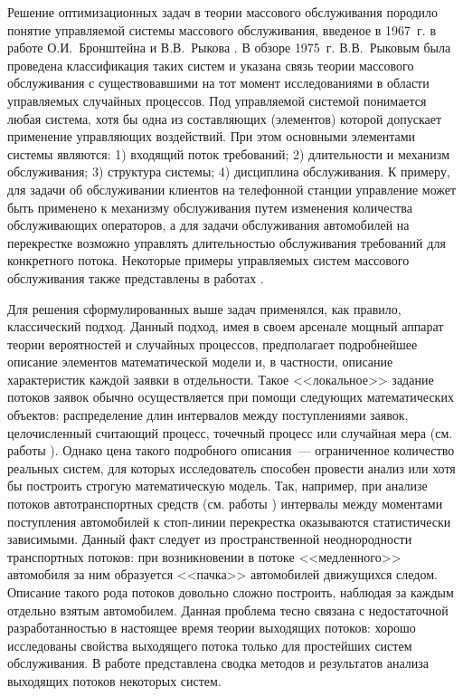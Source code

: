 Решение оптимизационных задач в теории массового обслуживания породило понятие управляемой системы массового обслуживания, введеное в 1967~г. в работе О.И.~Бронштейна и В.В.~Рыкова \cite{BronshteinRykov}. В обзоре \cite{Rykov:1975} 1975~г. В.В.~Рыковым была проведена классификация таких систем и указана связь теории массового обслуживания с существовавшими на тот момент исследованиями в области управляемых случайных процессов. Под управляемой системой понимается любая система, хотя бы одна из составляющих (элементов) которой допускает применение управляющих воздействий. При этом основными элементами системы являются: 1) входящий поток требований; 2) длительности и механизм обслуживания; 3) структура системы; 4) дисциплина обслуживания. К примеру, для задачи об обслуживании клиентов на телефонной станции управление может быть применено к механизму обслуживания путем изменения количества обслуживающих операторов, а для задачи обслуживания автомобилей на перекрестке возможно управлять длительностью обслуживания требований для конкретного потока. Некоторые примеры управляемых систем массового обслуживания также представлены в работах \cite{VerbickyRykov, Solodyannikov, Motov}.

Для решения сформулированных выше задач применялся, как правило, классический подход. Данный подход,  имея в своем арсенале мощный аппарат теории вероятностей и случайных процессов, предполагает подробнейшее описание элементов математической модели и, в частности, описание характеристик каждой заявки в отдельности. Такое <<локальное>> задание потоков заявок обычно осуществляется при помощи следующих математических объектов: распределение длин интервалов между поступлениями заявок, целочисленный считающий процесс, точечный процесс или случайная мера (см. работы \cite{Fedotkin:1996, Kabanov:74, Franken, Hinchin, Jagerman}). Однако цена такого подробного описания~--- ограниченное количество реальных систем, для которых исследователь способен провести анализ или хотя бы построить строгую математическую модель. Так, например, при анализе потоков автотранспортных средств (см. работы \cite{Fedotkin:81,Bartlett}) интервалы между моментами поступления автомобилей к стоп-линии перекрестка оказываются статистически зависимыми. Данный факт следует из пространственной неоднородности транспортных потоков: при возникновении в потоке <<медленного>> автомобиля за ним образуется <<пачка>> автомобилей движущихся следом. Описание такого рода потоков довольно сложно построить, наблюдая за каждым отдельно взятым автомобилем. Данная проблема тесно связана с недостаточной разработанностью в настоящее время теории выходящих потоков: хорошо исследованы свойства выходящего потока только для простейших систем обслуживания. В работе \cite{Bocharov:1995} представлена сводка методов и результатов анализа выходящих потоков некоторых систем.

